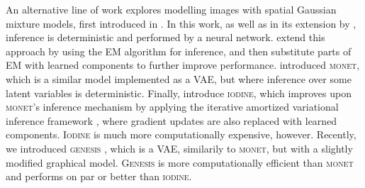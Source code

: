 	An alternative line of work explores modelling images with spatial Gaussian mixture models, first introduced in \cite{Greff2016tagger}.
	In this work, as well as in its extension by \cite{Ilin2017recurrentln}, inference is deterministic and performed by a neural network.
	\cite{Greff2017neuralem,Steenkiste2018rnem} extend this approach by using the \gls{EM} algorithm for inference, and then substitute parts of \gls{EM} with learned components to further improve performance.
	\cite{Burgess2019monet} introduced \textsc{monet}, which is a similar model implemented as a \gls{VAE}, but where inference over some latent variables is deterministic.
	Finally, \cite{Greff2019multi} introduce \textsc{iodine}, which improves upon \textsc{monet}'s inference mechanism by applying the iterative amortized variational inference framework \citep{Marino2018iavi}, where gradient updates are also replaced with learned components.
	\textsc{Iodine} is much more computationally expensive, however.
	Recently, we introduced \textsc{genesis} \citep{Engelcke2019genesis}, which is a \gls{VAE}, similarily to \textsc{monet}, but with a slightly modified graphical model.
	\textsc{Genesis} is more computationally efficient than \textsc{monet} and performs on par or better than \textsc{iodine}.